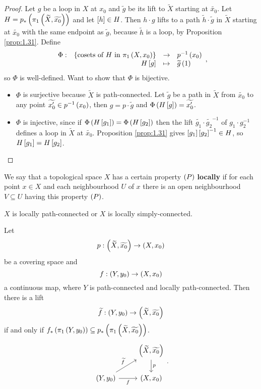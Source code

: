 \begin{proof}
Let $ g $ be a loop in $ X $ at $ x_0 $ and $ \widetilde{g} $ be its lift to $ \widetilde{X} $ starting at $ \widetilde{x_0} $. Let $ H = p_*\rb{\pi_1\rb{\widetilde{X}, \widetilde{x_0}}} $ and let $ \sb{h} \in H $. Then $ h \cdot g $ lifts to a path $ \widetilde{h} \cdot \widetilde{g} $ in $ \widetilde{X} $ starting at $ \widetilde{x_0} $ with the same endpoint as $ \widetilde{g} $, because $ \widetilde{h} $ is a loop, by Proposition \ref{prop:1.31}. Define
$$ \function[\Phi]{\cb{\text{cosets of} \ H \ \text{in} \ \pi_1\rb{X, x_0}}}{p^{-1}\rb{x_0}}{H\sb{g}}{\widetilde{g}\rb{1}}, $$
so $ \Phi $ is well-defined. Want to show that $ \Phi $ is bijective.
\begin{itemize}
\item $ \Phi $ is surjective because $ \widetilde{X} $ is path-connected. Let $ \widetilde{g} $ be a path in $ \widetilde{X} $ from $ \widetilde{x_0} $ to any point $ \widetilde{x_0'} \in p^{-1}\rb{x_0} $, then $ g = p \cdot \widetilde{g} $ and $ \Phi\rb{H\sb{g}} = \widetilde{x_0'} $.
\item $ \Phi $ is injective, since if $ \Phi\rb{H\sb{g_1}} = \Phi\rb{H\sb{g_2}} $ then the lift $ \widetilde{g_1} \cdot \widetilde{g_2}^{-1} $ of $ g_1 \cdot g_2^{-1} $ defines a loop in $ \widetilde{X} $ at $ \widetilde{x_0} $. Proposition \ref{prop:1.31} gives $ \sb{g_1}\sb{g_2}^{-1} \in H $, so $ H\sb{g_1} = H\sb{g_2} $.
\end{itemize}
\end{proof}

We say that a topological space $ X $ has a certain property $ \rb{P} $ \textbf{locally} if for each point $ x \in X $ and each neighbourhood $ U $ of $ x $ there is an open neighbourhood $ V \subseteq U $ having this property $ \rb{P} $.

\begin{example*}
$ X $ is locally path-connected or $ X $ is locally simply-connected.
\end{example*}

\begin{proposition}
Let
$$ p : \rb{\widetilde{X}, \widetilde{x_0}} \to \rb{X, x_0} $$
be a covering space and
$$ f : \rb{Y, y_0} \to \rb{X, x_0} $$
a continuous map, where $ Y $ is path-connected and locally path-connected. Then there is a lift
$$ \widetilde{f} : \rb{Y, y_0} \to \rb{\widetilde{X}, \widetilde{x_0}} $$
if and only if $ f_*\rb{\pi_1\rb{Y, y_0}} \subseteq p_*\rb{\pi_1\rb{\widetilde{X}, \widetilde{x_0}}} $.
$$
\begin{tikzcd}
& \rb{\widetilde{X}, \widetilde{x_0}} \arrow{d}{p} \\
\rb{Y, y_0} \arrow{ur}{\widetilde{f}} \arrow[swap]{r}{f} & \rb{X, x_0}
\end{tikzcd}.
$$
\end{proposition}

